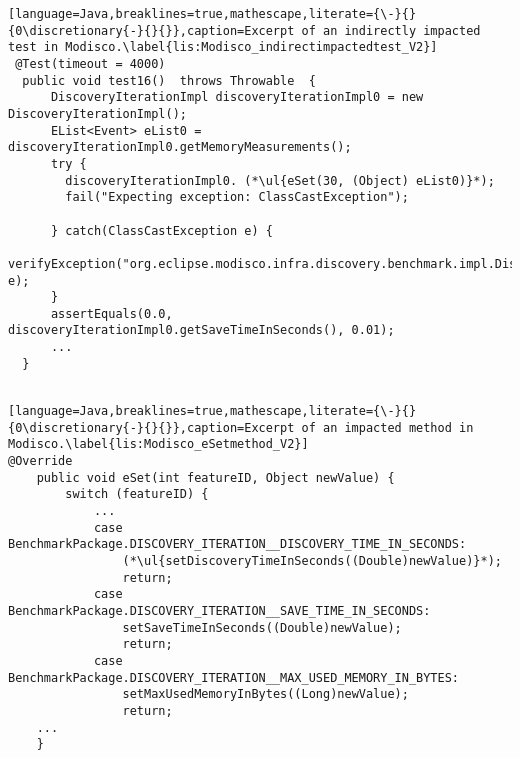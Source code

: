 \begin{lstlisting}[language=Java,breaklines=true,mathescape,literate={\-}{}{0\discretionary{-}{}{}},caption=Excerpt of an indirectly impacted test in Modisco.\label{lis:Modisco_indirectimpactedtest_V2}]
 @Test(timeout = 4000)
  public void test16()  throws Throwable  {
      DiscoveryIterationImpl discoveryIterationImpl0 = new DiscoveryIterationImpl();
      EList<Event> eList0 = discoveryIterationImpl0.getMemoryMeasurements();
      try { 
        discoveryIterationImpl0. (*\ul{eSet(30, (Object) eList0)}*);
        fail("Expecting exception: ClassCastException");
      
      } catch(ClassCastException e) {
        verifyException("org.eclipse.modisco.infra.discovery.benchmark.impl.DiscoveryIterationImpl", e);
      }
      assertEquals(0.0, discoveryIterationImpl0.getSaveTimeInSeconds(), 0.01);
      ...
  }
    
\end{lstlisting}



\begin{lstlisting}[language=Java,breaklines=true,mathescape,literate={\-}{}{0\discretionary{-}{}{}},caption=Excerpt of an impacted method in Modisco.\label{lis:Modisco_eSetmethod_V2}]
@Override
	public void eSet(int featureID, Object newValue) {
		switch (featureID) {
			...
			case BenchmarkPackage.DISCOVERY_ITERATION__DISCOVERY_TIME_IN_SECONDS:
				(*\ul{setDiscoveryTimeInSeconds((Double)newValue)}*);
				return;
			case BenchmarkPackage.DISCOVERY_ITERATION__SAVE_TIME_IN_SECONDS:
				setSaveTimeInSeconds((Double)newValue);
				return;
			case BenchmarkPackage.DISCOVERY_ITERATION__MAX_USED_MEMORY_IN_BYTES:
				setMaxUsedMemoryInBytes((Long)newValue);
				return;
    ...
    }
    
    
\end{lstlisting}

